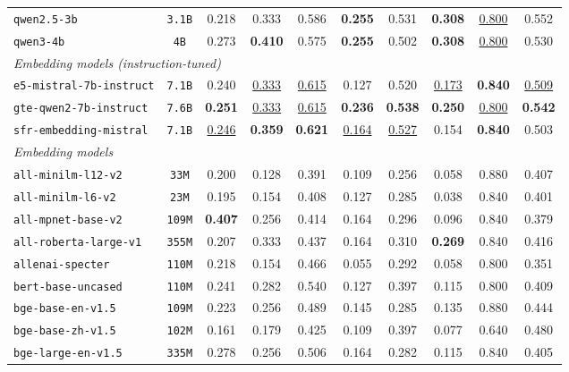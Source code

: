 \documentclass{article}
\begin{document}
\begin{table}[htbp]
{\begin{tabular}{lccccccccc}
\texttt{qwen2.5-3b} & \texttt{3.1B} & 0.218 & 0.333 & 0.586 & \textbf{0.255} & 0.531 & \textbf{0.308} & \underline{0.800} & 0.552 \\
\texttt{qwen3-4b} & \texttt{4B} & 0.273 & \textbf{0.410} & 0.575 & \textbf{0.255} & 0.502 & \textbf{0.308} & \underline{0.800} & 0.530 \\
\midrule
\multicolumn{10}{l}{\textit{Embedding models (instruction-tuned)}} \\
\midrule
\texttt{e5-mistral-7b-instruct} & \texttt{7.1B} & 0.240 & \underline{0.333} & \underline{0.615} & 0.127 & 0.520 & \underline{0.173} & \textbf{0.840} & \underline{0.509} \\
\texttt{gte-qwen2-7b-instruct} & \texttt{7.6B} & \textbf{0.251} & \underline{0.333} & \underline{0.615} & \textbf{0.236} & \textbf{0.538} & \textbf{0.250} & \underline{0.800} & \textbf{0.542} \\
\texttt{sfr-embedding-mistral} & \texttt{7.1B} & \underline{0.246} & \textbf{0.359} & \textbf{0.621} & \underline{0.164} & \underline{0.527} & 0.154 & \textbf{0.840} & 0.503 \\
\midrule
\multicolumn{10}{l}{\textit{Embedding models}} \\
\midrule
\texttt{all-minilm-l12-v2} & \texttt{33M} & 0.200 & 0.128 & 0.391 & 0.109 & 0.256 & 0.058 & 0.880 & 0.407 \\
\texttt{all-minilm-l6-v2} & \texttt{23M} & 0.195 & 0.154 & 0.408 & 0.127 & 0.285 & 0.038 & 0.840 & 0.401 \\
\texttt{all-mpnet-base-v2} & \texttt{109M} & \textbf{0.407} & 0.256 & 0.414 & 0.164 & 0.296 & 0.096 & 0.840 & 0.379 \\
\texttt{all-roberta-large-v1} & \texttt{355M} & 0.207 & 0.333 & 0.437 & 0.164 & 0.310 & \textbf{0.269} & 0.840 & 0.416 \\
\texttt{allenai-specter} & \texttt{110M} & 0.218 & 0.154 & 0.466 & 0.055 & 0.292 & 0.058 & 0.800 & 0.351 \\
\texttt{bert-base-uncased} & \texttt{110M} & 0.241 & 0.282 & 0.540 & 0.127 & 0.397 & 0.115 & 0.800 & 0.409 \\
\texttt{bge-base-en-v1.5} & \texttt{109M} & 0.223 & 0.256 & 0.489 & 0.145 & 0.285 & 0.135 & 0.880 & 0.444 \\
\texttt{bge-base-zh-v1.5} & \texttt{102M} & 0.161 & 0.179 & 0.425 & 0.109 & 0.397 & 0.077 & 0.640 & 0.480 \\
\texttt{bge-large-en-v1.5} & \texttt{335M} & 0.278 & 0.256 & 0.506 & 0.164 & 0.282 & 0.115 & 0.840 & 0.405 \\

\end{tabular}}
\end{table}
\end{document}
